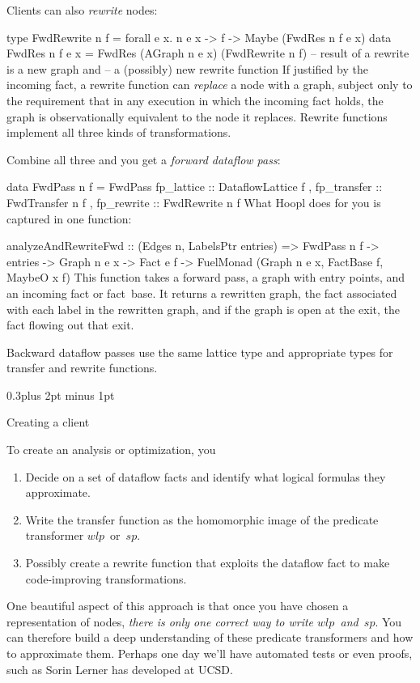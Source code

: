 \documentclass[twocolumn]{article}
\makeatletter
\newenvironment{code}{\par\unskip\kern-6pt \small\verbatim}{\endverbatim}
\newenvironment{smallcode}{\par\unskip\footnotesize\verbatim}{\endverbatim}
\newcommand\mysection[1]{%
  \par
  \vskip 0.5\baselineskip plus 2pt minus 1pt
  \noindent{\raggedright\textbf{#1}}
  \par
  \vskip 0.3\baselineskip plus 2pt minus 1pt
  \@afterindentfalse
}
\renewcommand\wp{\ensuremath{\mathit{wlp}}}
\renewcommand\sp{\ensuremath{\mathit{sp}}}
\renewcommand\mysection[1]{%
  \@startsection{section}{1}{\z@}{-0.5\baselineskip plus -2pt minus -1pt}%
                                   {0.3\baselineskip plus 2pt minus 1pt}%
           {\normalfont\raggedright\bfseries}}
\makeatother
\begin{document}
Clients can also \emph{rewrite} nodes:
\begin{smallcode}
type FwdRewrite n f 
  = forall e x. n e x -> f -> Maybe (FwdRes n f e x)
data FwdRes n f e x = FwdRes (AGraph n e x) (FwdRewrite n f)
  -- result of a rewrite is a new graph and 
  -- a (possibly) new rewrite function
\end{smallcode}
If justified by the incoming fact, a rewrite function can
\emph{replace} a node with a graph, subject only to the requirement
that in any execution in which the incoming fact holds, the graph is
observationally equivalent to the node it replaces.
Rewrite functions implement all three kinds of transformations.

Combine all three and you get a \emph{forward dataflow pass}:
\begin{code}
data FwdPass n f
  = FwdPass { fp_lattice  :: DataflowLattice f
            , fp_transfer :: FwdTransfer n f
            , fp_rewrite  :: FwdRewrite n f }
\end{code}
What Hoopl does for you is captured in one function:
\begin{smallcode}
analyzeAndRewriteFwd
   :: (Edges n, LabelsPtr entries)
   => FwdPass n f
   -> entries
   -> Graph n e x 
   -> Fact e f
   -> FuelMonad (Graph n e x, FactBase f, MaybeO x f)
\end{smallcode}
This function takes a forward pass, a graph with entry points,
and an incoming fact or fact~base.
It returns a rewritten graph, the fact associated with each label in
the rewritten graph, and if the graph is open at the exit, the fact
flowing out that exit.

Backward dataflow passes use the same lattice type and appropriate
types for transfer and rewrite functions.

\mysection*{Creating a client}

To create an analysis or optimization, you
\begin{enumerate} 
\item
Decide on a set of dataflow facts and identify what logical formulas
they approximate.
\item
Write the transfer function as the homomorphic image of the predicate
 transformer  \wp~or~\sp.
\item
Possibly create a rewrite function that exploits the dataflow fact to
make code-improving transformations.
\end{enumerate}
One beautiful aspect of this approach is that once you have chosen
a representation of nodes, \emph{there is only one correct way to
  write \wp~and~\sp}.  
You can therefore build a deep understanding of these predicate
transformers and how to approximate them.
Perhaps one day we'll have automated tests or even proofs, such as
Sorin Lerner has developed at UCSD.
\end{document}
